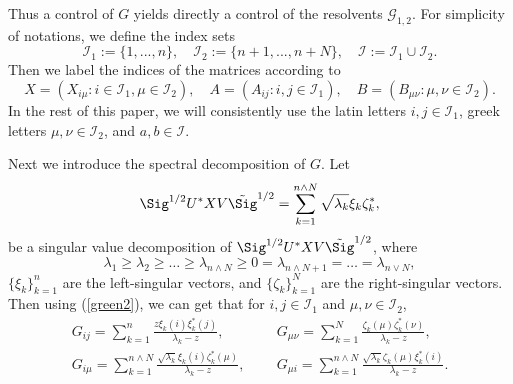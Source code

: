 Thus a control of $G$ yields directly a control of the resolvents $\mathcal G_{1,2}$. For simplicity of notations, we define the index sets
\[\mathcal I_1:=\{1,...,n\}, \quad \mathcal I_2:=\{n+1,...,n+N\}, \quad \mathcal I:=\mathcal I_1\cup\mathcal I_2.\]
Then we label the indices of the matrices according to 
$$X= (X_{i\mu}:i\in \mathcal I_1, \mu \in \mathcal I_2), \quad A=(A_{ij}: i,j\in \mathcal I_1),\quad B=(B_{\mu\nu}: \mu,\nu\in \mathcal I_2).$$  
In the rest of this paper, %
we will consistently use the latin letters $i,j\in\mathcal I_1$, greek letters $\mu,\nu\in\mathcal I_2$, and $a,b\in\mathcal I$. 

 
Next we introduce the spectral decomposition of $G$. Let
$$\Sig^{1/2} U^{*}X V\tilde \Sig^{1/2}  = \sum_{k = 1}^{n\wedge N} {\sqrt {\lambda_k} \xi_k } \zeta _{k}^* ,$$
be a singular value decomposition of $\Sig^{1/2} U^{*}X V\tilde \Sig^{1/2}$, where
$$\lambda_1\ge \lambda_2 \ge \ldots \ge \lambda_{n\wedge N} \ge 0 = \lambda_{n\wedge N+1} = \ldots = \lambda_{n\vee N},$$
$\{\xi_{k}\}_{k=1}^{n}$ are the left-singular vectors, and $\{\zeta_{k}\}_{k=1}^{N}$ are the right-singular vectors.
Then using (\ref{green2}), we can get that for $i,j\in \mathcal I_1$ and $\mu,\nu\in \mathcal I_2$,
\begin{align}
G_{ij} = \sum_{k = 1}^{n} \frac{z\xi_k(i) \xi_k^*(j)}{\lambda_k-z},\ \quad \ &G_{\mu\nu} = \sum_{k = 1}^{N} \frac{\zeta_k(\mu) \zeta_k^*(\nu)}{\lambda_k-z}, \label{spectral1}\\
G_{i\mu} = \sum_{k = 1}^{n\wedge N} \frac{\sqrt{\lambda_k}\xi_k(i) \zeta_k^*(\mu)}{\lambda_k-z}, \ \quad \ &G_{\mu i} = \sum_{k = 1}^{n\wedge N} \frac{\sqrt{\lambda_k}\zeta_k(\mu) \xi_k^*(i)}{\lambda_k-z}.\label{spectral2}
\end{align}


